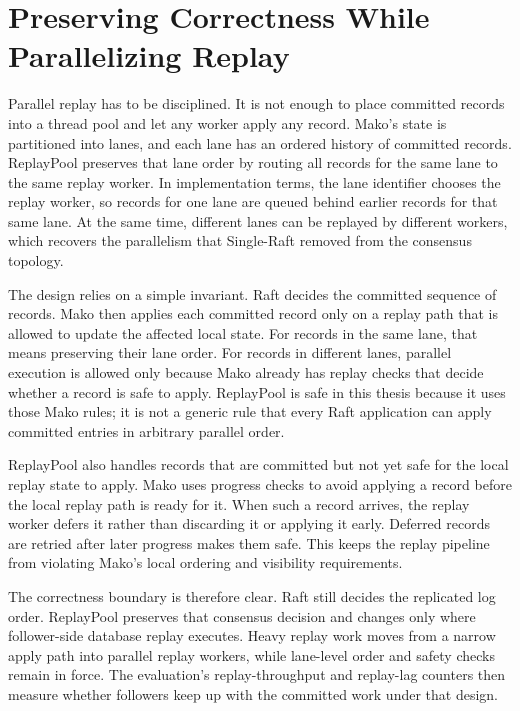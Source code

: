 \section{Preserving Correctness While Parallelizing Replay}

Parallel replay has to be disciplined. It is not enough to place committed
records into a thread pool and let any worker apply any record. Mako's state is
partitioned into lanes, and each lane has an ordered history of committed
records. ReplayPool preserves that lane order by routing all records for the
same lane to the same replay worker. In implementation terms, the lane
identifier chooses the replay worker, so records for one lane are queued behind
earlier records for that same lane. At the same time, different lanes can be
replayed by different workers, which recovers the parallelism that Single-Raft
removed from the consensus topology.

The design relies on a simple invariant. Raft decides the committed sequence of
records. Mako then applies each committed record only on a replay path that is
allowed to update the affected local state. For records in the same lane, that
means preserving their lane order. For records in different lanes, parallel
execution is allowed only because Mako already has replay checks that decide
whether a record is safe to apply. ReplayPool is safe in this thesis because it
uses those Mako rules; it is not a generic rule that every Raft application can
apply committed entries in arbitrary parallel order.

ReplayPool also handles records that are committed but not yet safe for the
local replay state to apply. Mako uses progress checks to avoid applying a
record before the local replay path is ready for it. When such a record
arrives, the replay worker defers it rather than discarding it or applying it
early. Deferred records are retried after later progress makes them safe. This
keeps the replay pipeline from violating Mako's local ordering and visibility
requirements.

The correctness boundary is therefore clear. Raft still decides the replicated
log order. ReplayPool preserves that consensus decision and changes only where
follower-side database replay executes. Heavy replay work moves from a narrow
apply path into parallel replay workers, while lane-level order and safety
checks remain in force. The evaluation's replay-throughput and replay-lag
counters then measure whether followers keep up with the committed work under
that design.

